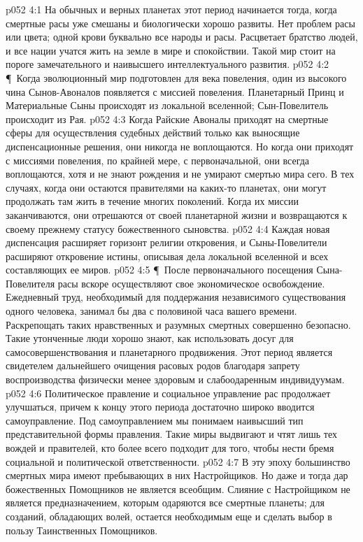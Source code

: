 \vs p052 4:1 На обычных и верных планетах этот период начинается тогда, когда смертные расы уже смешаны и биологически хорошо развиты. Нет проблем расы или цвета; одной крови буквально все народы и расы. Расцветает братство людей, и все нации учатся жить на земле в мире и спокойствии. Такой мир стоит на пороге замечательного и наивысшего интеллектуального развития.
\vs p052 4:2 \P\ Когда эволюционный мир подготовлен для века повеления, один из высокого чина Сынов\hyp{}Авоналов появляется с миссией повеления. Планетарный Принц и Материальные Сыны происходят из локальной вселенной; Сын\hyp{}Повелитель происходит из Рая.
\vs p052 4:3 Когда Райские Авоналы приходят на смертные сферы для осуществления судебных действий только как выносящие диспенсационные решения, они никогда не воплощаются. Но когда они приходят с миссиями повеления, по крайней мере, с первоначальной, они всегда воплощаются, хотя и не знают рождения и не умирают смертью мира сего. В тех случаях, когда они остаются правителями на каких\hyp{}то планетах, они могут продолжать там жить в течение многих поколений. Когда их миссии заканчиваются, они отрешаются от своей планетарной жизни и возвращаются к своему прежнему статусу божественного сыновства.
\vs p052 4:4 Каждая новая диспенсация расширяет горизонт религии откровения, и Сыны\hyp{}Повелители расширяют откровение истины, описывая дела локальной вселенной и всех составляющих ее миров.
\vs p052 4:5 \P\ После первоначального посещения Сына\hyp{}Повелителя расы вскоре осуществляют свое экономическое освобождение. Ежедневный труд, необходимый для поддержания независимого существования одного человека, занимал бы два с половиной часа вашего времени. Раскрепощать таких нравственных и разумных смертных совершенно безопасно. Такие утонченные люди хорошо знают, как использовать досуг для самосовершенствования и планетарного продвижения. Этот период является свидетелем дальнейшего очищения расовых родов благодаря запрету воспроизводства физически менее здоровым и слабоодаренным индивидуумам.
\vs p052 4:6 Политическое правление и социальное управление рас продолжает улучшаться, причем к концу этого периода достаточно широко вводится самоуправление. Под самоуправлением мы понимаем наивысший тип представительной формы правления. Такие миры выдвигают и чтят лишь тех вождей и правителей, кто более всего подходит для того, чтобы нести бремя социальной и политической ответственности.
\vs p052 4:7 В эту эпоху большинство смертных мира имеют пребывающих в них Настройщиков. Но даже и тогда дар божественных Помощников не является всеобщим. Слияние с Настройщиком не является предназначением, которым одаряются все смертные планеты; для созданий, обладающих волей, остается необходимым еще и сделать выбор в пользу Таинственных Помощников.
